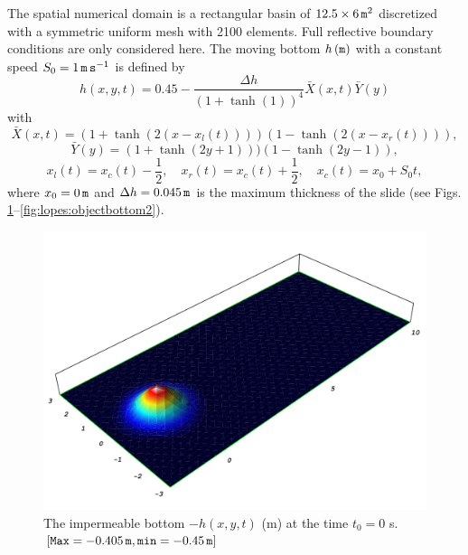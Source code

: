 The spatial numerical domain is a rectangular basin of
$12.5\times 6\, {\tt m}^2$ discretized with a symmetric
uniform mesh with 2100 elements.  Full reflective boundary
conditions are only considered here.  The moving bottom $h\,
({\tt m})$ with a constant speed $S_0=1\, {\tt m\, s}^{-1}$
is defined by
\begin{equation}\label{eq:lopes:bottom1}
h(x,y,t)=0.45-\frac{\Delta h}{(1+\tanh(1))^4}{\bar
  X}(x,t){\bar Y}(y)
\end{equation}
with
\begin{equation}
{\bar X}(x,t)=(1+\tanh(2(x-x_l(t))))(1-\tanh(2(x-x_r(t)))),
\end{equation}
\begin{equation}
{\bar Y}(y)=(1+\tanh(2y+1)))(1-\tanh(2y-1)),
\end{equation}
\begin{equation}\label{eq:lopes:bottom4}
x_l(t)=x_c(t)-\frac{1}{2},\quad
x_r(t)=x_c(t)+\frac{1}{2},\quad x_c(t)=x_0+S_0t,
\end{equation}
 where $x_0=0\, {\tt m}$ and $\Delta h=0.045\, {\tt m}$ is the maximum
 thickness of the slide (see
 Figs. \ref{fig:lopes:objectbottom}--\ref{fig:lopes:objectbottom2}).
\begin{figure}
\begin{center}
\includegraphics[width=\largefig]{chapters/lopes/pdf/depth0.pdf}
\end{center}
\caption{The impermeable bottom $-h(x,y,t)$ (m) at
  the time $t_0=0$ s. $[{\tt Max}= -0.405\, {\tt m},
    {\tt min}=-0.45\,{\tt m}]$}
\label{fig:lopes:objectbottom}
\end{figure}
